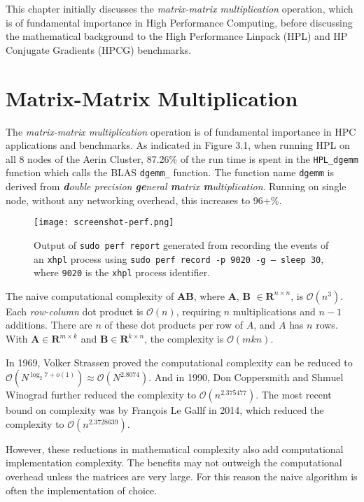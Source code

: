 This chapter initially discusses the \emph{matrix-matrix multiplication} operation, which is of fundamental importance in High Performance Computing, before discussing the mathematical background to the High Performance Linpack (HPL) and HP Conjugate Gradients (HPCG) benchmarks.


%
%
\section{Matrix-Matrix Multiplication}

The \emph{matrix-matrix multiplication} operation is of fundamental importance in HPC applications and benchmarks. As indicated in Figure 3.1, when running HPL on all 8 nodes of the Aerin Cluster, 87.26\% of the run time is spent in the \verb|HPL_dgemm| function which calls the BLAS \verb|dgemm_| function. The function name \verb|dgemm| is derived from \emph{\textbf{d}ouble precision \textbf{ge}neral \textbf{m}atrix \textbf{m}ultiplication}. Running on single node, without any networking overhead, this increases to 96+\%.

\begin{figure}[h]
	\centering	
	\texttt{[image: screenshot-perf.png]}
	\caption{Output of \texttt{sudo perf report} generated from recording the events of an \texttt{xhpl} process using \texttt{sudo perf record -p 9020 -g -- sleep 30}, where \texttt{9020} is the \texttt{xhpl} process identifier.}
\end{figure}

The naive computational complexity of $\mathbf{AB}$, where $\mathbf{A}$, $\mathbf{B}$ $\in \mathbf{R}^{n \times n}$, is $\mathcal{O}(n^3)$. Each \emph{row-column} dot product is $\mathcal{O}(n)$, requiring $n$ multiplications and $n - 1$ additions. There are $n$ of these dot products per row of $A$, and $A$ has $n$ rows. With $\mathbf{A} \in \mathbf{R}^{m \times k}$ and $\mathbf{B} \in \mathbf{R}^{k \times n}$, the complexity is $\mathcal{O}(mkn).$ 

In 1969, Volker Strassen proved the computational complexity can be reduced to $\mathcal{O}(N^{\log _{2}7+o(1)})\approx \mathcal{O}(N^{2.8074})$. And in 1990, Don Coppersmith and Shmuel Winograd further reduced the complexity to $\mathcal{O}(n^{2.375477})$. The most recent bound on complexity was by François Le Gallf in 2014, which reduced the complexity to $\mathcal {O}(n^{2.3728639})$.

However, these reductions in mathematical complexity also add computational implementation complexity. The benefits may not outweigh the computational overhead unless the matrices are very large. For this reason the naive algorithm is often the implementation of choice.    


